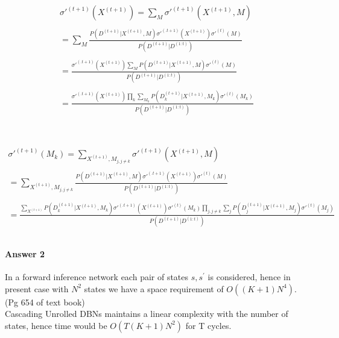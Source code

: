 \documentclass[12pt]{article}
\begin{document}
\[\begin{array}{l}
 \sigma {'^{(t + 1)}}({X^{(t + 1)}}) = \sum\nolimits_M {\sigma {'^{(t + 1)}}({X^{(t + 1)}},M)}  \\ \\
  = \sum\limits_M {\frac{{P({D^{(t + 1)}}|{X^{(t + 1)}},M)\sigma {'^{(.t + 1)}}({X^{(t + 1)}})\sigma {'^{(t)}}(M)}}{{P({D^{(t + 1)}}|{D^{(1:t)}})}}}  \\ \\
  = \frac{{\sigma {'^{(.t + 1)}}({X^{(t + 1)}})\sum\limits_M {P({D^{(t + 1)}}|{X^{(t + 1)}},M)\sigma {'^{(t)}}(M)} }}{{P({D^{(t + 1)}}|{D^{(1:t)}})}} \\ \\
  = \frac{{\sigma {'^{(.t + 1)}}({X^{(t + 1)}})\prod\limits_k {\sum\limits_{{M_k}} {P({D^{(t + 1)}_{k}}|{X^{(t + 1)}},{M_k})\sigma {'^{(t)}}({M_k})} } }}{{P({D^{(t + 1)}}|{D^{(1:t)}})}} \\ 
 \end{array}\]
 \\
 \\
 
 \[\begin{array}{l}
 \sigma {'^{(t + 1)}}({M_k}) = \sum\nolimits_{{X^{(t + 1)}},{M_{j,j \ne k}}} {\sigma {'^{(t + 1)}}({X^{(t + 1)}},M)}  \\ \\
  = \sum\limits_{{X^{(t + 1)}},{M_{j,j \ne k}}} {\frac{{P({D^{(t + 1)}}|{X^{(t + 1)}},M)\sigma {'^{(.t + 1)}}({X^{(t + 1)}})\sigma {'^{(t)}}(M)}}{{P({D^{(t + 1)}}|{D^{(1:t)}})}}}  \\ \\
  = \frac{{\sum\limits_{{X^{(t + 1)}}} {P({D^{(t + 1)}_{k}}|{X^{(t + 1)}},{M_k})\sigma {'^{(.t + 1)}}({X^{(t + 1)}})} \sigma {'^{(t)}}({M_k})\prod\limits_{j,j \ne k} {\sum\limits_j {P({D^{(t + 1)}_{j}}|{X^{(t + 1)}},{M_j})\sigma {'^{(t)}}({M_j})} } }}{{P({D^{(t + 1)}}|{D^{(1:t)}})}} \\ \\
 \end{array}\]

 
\paragraph{Answer 2}

In a forward inference network each pair of states $s,s^{'}$ is considered, hence in present case with $N^{2}$ states we have a space requirement of $O((K+1)N^{4})$. (Pg 654 of text book)\\
Cascading Unrolled DBNs maintains a linear complexity with the number of states, hence time would be $O(T(K+1)N^{2})$ for T cycles.
\end{document}
